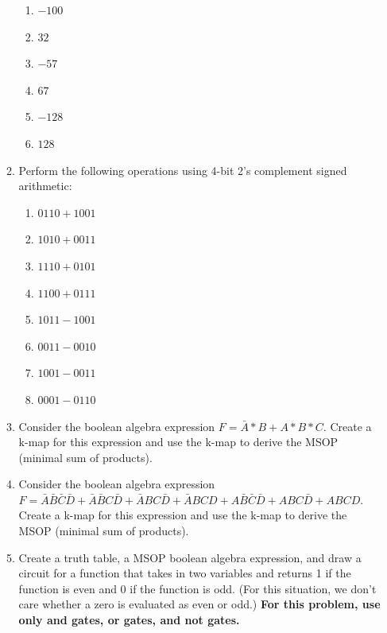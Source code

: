 \documentclass[10pt]{article}
\begin{document}
\begin{itemize}
\begin{enumerate}
\begin{enumerate}[label=\Alph*]
\item $-100$

\item $32$

\item $-57$

\item $67$

\item $-128$

\item $128$

\end{enumerate}

\item Perform the following operations using 4-bit 2's complement signed arithmetic:
\begin{enumerate}[label=\Alph*]


\item $0110 + 1001$

\item $1010 + 0011$

\item $1110 + 0101$

\item $1100 + 0111$

\item $1011 - 1001$

\item $0011 - 0010$

\item $1001 - 0011$

\item $0001 - 0110$


\end{enumerate}

\item Consider the boolean algebra expression $F = \bar{A} *B + A*B*C$.  Create a k-map for this expression and use the k-map to derive the MSOP (minimal sum of products).

\item Consider the boolean algebra expression $F = \bar{A}\bar{B}\bar{C}\bar{D}+\bar{A}\bar{B}C\bar{D}+\bar{A}BC\bar{D}+\bar{A}BCD+A\bar{B}\bar{C}\bar{D}+ABC\bar{D}+ABCD$.  Create a k-map for this expression and use the k-map to derive the MSOP (minimal sum of products).

\item Create a truth table, a MSOP boolean algebra expression, and draw a circuit for a function that takes in two variables and returns 1 if the function is even and 0 if the function is odd.  (For this situation, we don't care whether a zero is evaluated as even or odd.) \textbf{For this problem, use only and gates, or gates, and not gates.}


\end{enumerate}
\end{itemize}
\end{document}
